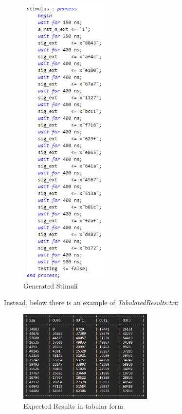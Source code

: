\begin{figure}[H]
    \centering
    \includegraphics[width=0.4\textwidth]{img/Chapter4/GeneratedStimuli.png}
    \caption{Generated Stimuli}
    \label{fig:GenStimuli}
\end{figure}

\newpage

Instead, below there is an example of \textit{TabulatedResults.txt}:

\begin{figure}[H]
    \centering
    \includegraphics[width=0.6\textwidth]{img/Chapter4/ExpectedTabular.png}
    \caption{Expected Results in tabular form}
    \label{fig:ExpectedRes}
\end{figure}

